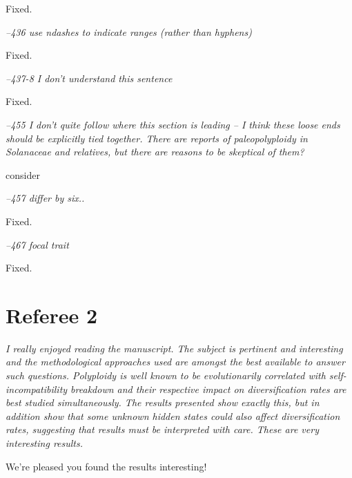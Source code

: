 \documentclass[11pt]{article}
\renewenvironment{quote}{\bigskip\noindent\itshape\ignorespaces}{\smallskip}
\begin{document}
Fixed.

\begin{quote}
--436  use ndashes to indicate ranges (rather than hyphens)
\end{quote}

Fixed.

\begin{quote}
--437-8 I don't understand this sentence
\end{quote}

Fixed.

\begin{quote}
--455  I don't quite follow where this section is leading -- I think these loose ends should be explicitly tied together.
There are reports of paleopolyploidy in Solanaceae and relatives, but there are reasons to be skeptical of them?
\end{quote}

consider %

\begin{quote}
--457  differ by six..
\end{quote}

Fixed.

\begin{quote}
--467  focal trait
\end{quote}

Fixed.

\section{Referee 2}
\vspace{-11pt}

\begin{quote}
I really enjoyed reading the manuscript.
The subject is pertinent and interesting and the methodological approaches used are amongst the best available to answer such questions.
Polyploidy is well known to be evolutionarily correlated with self-incompatibility breakdown and their respective impact on diversification rates are best studied simultaneously.
The results presented show exactly this, but in addition show that some unknown hidden states could also affect diversification rates, suggesting that results must be interpreted with care.
These are very interesting results.
\end{quote}

We're pleased you found the results interesting!
\end{document}
